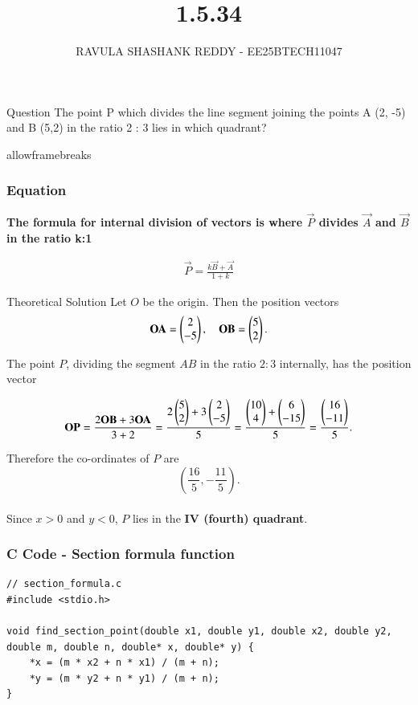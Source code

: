 \documentclass{beamer}
\title %
{1.5.34}
\author %
{RAVULA SHASHANK REDDY - EE25BTECH11047}
\begin{document}
	
	
	\frame{\titlepage}
	\begin{frame}{Question}
		The point P which divides the line segment joining the points A (2, -5)
		and B (5,2) in the ratio 2 : 3 lies in which quadrant?
	\end{frame}
	\begin{frame}{allowframebreaks}
		\frametitle{Equation}
	\textbf{The formula for internal division of vectors is where $\vec{P}$ divides $\vec{A}$ and $\vec{B}$ in the ratio k:1}
		\centering
		
		\label{tab:parameters}
		\begin{align*}
			\vec{P} =	\frac{k\vec{B} + \vec{A}}{1+k} 
		\end{align*}
		\end{frame}	
	
	\begin{frame}{Theoretical Solution}
Let \(O\) be the origin. Then the position vectors 
\begin{align*}
\mathbf{OA} = \begin{pmatrix}2 \\ -5\end{pmatrix}, \quad \mathbf{OB} = \begin{pmatrix}5 \\ 2\end{pmatrix}.
\end{align*}

The point \(P\), dividing the segment \(AB\) in the ratio \(2:3\) internally, has the position vector

\[
\mathbf{OP} = \frac{2 \mathbf{OB} + 3\mathbf{OA}}{3 + 2} = \frac{2 \begin{pmatrix}5 \\ 2\end{pmatrix} + 3\begin{pmatrix}2 \\ -5\end{pmatrix}}{5} = \frac{\begin{pmatrix}10 \\ 4\end{pmatrix} + \begin{pmatrix}6 \\ -15\end{pmatrix}}{5} = \frac{\begin{pmatrix}16 \\ -11\end{pmatrix}}{5}.
\]

Therefore the co-ordinates of \(P\) are \[
\left(\dfrac{16}{5}, -\dfrac{11}{5}\right).
\]
\\
Since \(x>0\) and \(y<0\), \(P\) lies in the \textbf{IV (fourth) quadrant}.

\end{frame}
	
	\begin{frame}[fragile]
		\frametitle{C Code - Section formula function }
		
		\begin{lstlisting}
// section_formula.c
#include <stdio.h>

void find_section_point(double x1, double y1, double x2, double y2, double m, double n, double* x, double* y) {
	*x = (m * x2 + n * x1) / (m + n);
	*y = (m * y2 + n * y1) / (m + n);
}
			\end{lstlisting}
		\end{frame}
\end{document}
